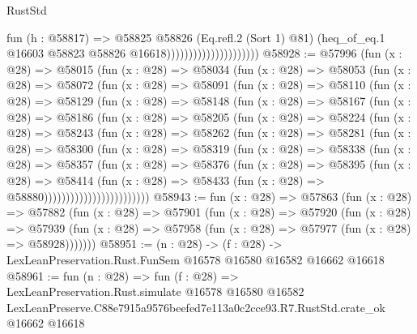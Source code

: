 \begin{lexlean}{RustStd}
\begin{coremodule}
                                          fun (h : @58817) =>
                                          @58825
                                            @58826
                                            (Eq.refl.{2} (Sort 1) @81)
                                            (heq_of_eq.{1}
                                              @16603
                                              @58823
                                              @58826
                                              @16618)))))))))))))))))))))
@58928 := @57996
    (fun (x : @28) =>
    @58015
      (fun (x : @28) =>
      @58034
        (fun (x : @28) =>
        @58053
          (fun (x : @28) =>
          @58072
            (fun (x : @28) =>
            @58091
              (fun (x : @28) =>
              @58110
                (fun (x : @28) =>
                @58129
                  (fun (x : @28) =>
                  @58148
                    (fun (x : @28) =>
                    @58167
                      (fun (x : @28) =>
                      @58186
                        (fun (x : @28) =>
                        @58205
                          (fun (x : @28) =>
                          @58224
                            (fun (x : @28) =>
                            @58243
                              (fun (x : @28) =>
                              @58262
                                (fun (x : @28) =>
                                @58281
                                  (fun (x : @28) =>
                                  @58300
                                    (fun (x : @28) =>
                                    @58319
                                      (fun (x : @28) =>
                                      @58338
                                        (fun (x : @28) =>
                                        @58357
                                          (fun (x : @28) =>
                                          @58376
                                            (fun (x : @28) =>
                                            @58395
                                              (fun (x : @28) =>
                                              @58414
                                                (fun (x : @28) =>
                                                @58433
                                                  (fun (x : @28) => @58880))))))))))))))))))))))))
@58943 := fun (x : @28) =>
  @57863
    (fun (x : @28) =>
    @57882
      (fun (x : @28) =>
      @57901
        (fun (x : @28) =>
        @57920
          (fun (x : @28) =>
          @57939 (fun (x : @28) => @57958 (fun (x : @28) => @57977 (fun (x : @28) => @58928)))))))
@58951 := (n : @28) ->
  (f : @28) -> LexLeanPreservation.Rust.FunSem @16578 @16580 @16582 @16662 @16618
@58961 := fun (n : @28) =>
  fun (f : @28) =>
  LexLeanPreservation.Rust.simulate
    @16578
    @16580
    @16582
    LexLeanPreserve.C88e7915a9576beefed7e113a0c2cce93.R7.RustStd.crate_ok
    @16662
    @16618
\end{coremodule}
\end{lexlean}
